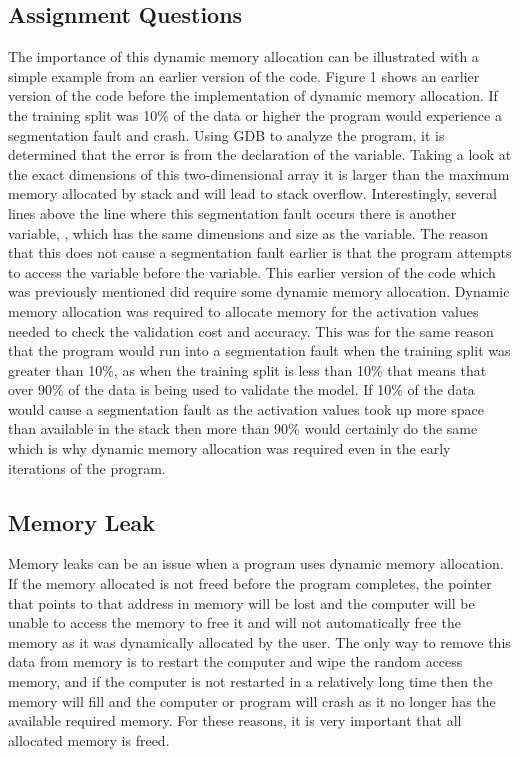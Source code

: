 \documentclass[12pt]{article}
\begin{document}
\subsection{Assignment Questions}

The importance of this dynamic memory allocation can be illustrated with a simple example from an earlier version of the code. Figure 1 shows an earlier version of the code before the implementation of dynamic memory allocation. If the training split was 10\% of the data or higher the program would experience a segmentation fault and crash. Using GDB to analyze the program, it is determined that the error is from the declaration of the  variable. Taking a look at the exact dimensions of this two-dimensional array it is larger than the maximum memory allocated by stack and will lead to stack overflow. Interestingly, several lines above the line where this segmentation fault occurs there is another variable, , which has the same dimensions and size as the  variable. The reason that this does not cause a segmentation fault earlier is that the program attempts to access the  variable before the  variable.
This earlier version of the code which was previously mentioned did require some dynamic memory allocation. Dynamic memory allocation was required to allocate memory for the activation values needed to check the validation cost and accuracy. This was for the same reason that the program would run into a segmentation fault when the training split was greater than 10\%, as when the training split is less than 10\% that means that over 90\% of the data is being used to validate the model. If 10\% of the data would cause a segmentation fault as the activation values took up more space than available in the stack then more than 90\% would certainly do the same which is why dynamic memory allocation was required even in the early iterations of the program.


\subsection{Memory Leak}

Memory leaks can be an issue when a program uses dynamic memory allocation. If the memory allocated is not freed before the program completes, the pointer that points to that address in memory will be lost and the computer will be unable to access the memory to free it and will not automatically free the memory as it was dynamically allocated by the user. The only way to remove this data from memory is to restart the computer and wipe the random access memory, and if the computer is not restarted in a relatively long time then the memory will fill and the computer or program will crash as it no longer has the available required memory. For these reasons, it is very important that all allocated memory is freed.
\end{document}
